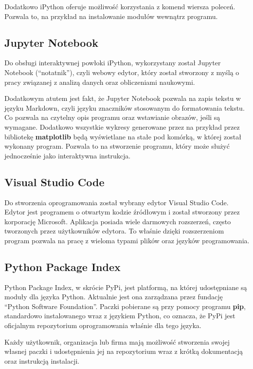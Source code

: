 \quad Dodatkowo iPython oferuje możliwość korzystania z komend wiersza poleceń. Pozwala to, na przykład na instalowanie modułów wewnątrz programu. 

\subsection{Jupyter Notebook}

\quad Do obsługi interaktywnej powłoki iPython, wykorzystany został Jupyter Notebook (\enquote{notatnik}), czyli webowy edytor, który został stworzony z myślą o pracy związanej z analizą danych oraz obliczeniami naukowymi. 

\quad Dodatkowym atutem jest fakt, że Jupyter Notebook pozwala na zapis tekstu w języku Markdown, czyli języku znaczników stosowanym do formatowania tekstu. Co pozwala na czytelny opis programu oraz wstawianie obrazów, jeśli są wymagane. Dodatkowo wszystkie wykresy generowane przez na przykład przez bibliotekę \textbf{matplotlib} będą wyświetlane na stałe pod komórką, w której został wykonany program. Pozwala to na stworzenie programu, który może służyć jednocześnie jako interaktywna instrukcja. 

\subsection{Visual Studio Code}

\quad Do stworzenia oprogramowania został wybrany edytor Visual Studio Code. Edytor jest programem o otwartym kodzie źródłowym i został stworzony przez korporację Microsoft. Aplikacja posiada wiele darmowych rozszerzeń, często tworzonych przez użytkowników edytora. To właśnie dzięki rozszerzeniom program pozwala na pracę z wieloma typami plików oraz języków programowania.  

\subsection{Python Package Index}
\quad Python Package Index, w skrócie PyPi, jest platformą, na której udostępniane są moduły dla języka Python. Aktualnie jest ona zarządzana przez fundację \enquote{Python Software Foundation}. Paczki pobierane są przy pomocy programu \textbf{pip}, standardowo instalowanego wraz z językiem Python, co oznacza, że PyPi jest oficjalnym repozytorium oprogramowania właśnie dla tego języka. 

\quad Każdy użytkownik, organizacja lub firma mają możliwość stworzenia swojej własnej paczki i udostępnienia jej na repozytorium wraz z krótką dokumentacją oraz instrukcją instalacji.

